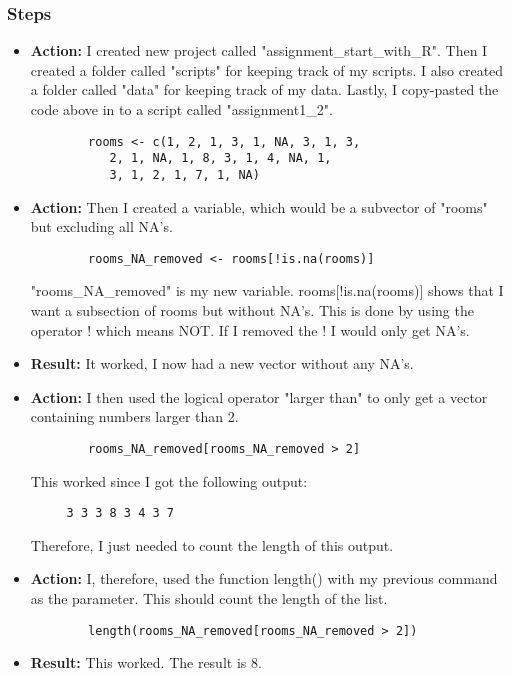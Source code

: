 \documentclass{article}
\begin{document}
\subsubsection{Steps}
\begin{itemize}
    \item \textbf{Action:} I created new project called "assignment\_start\_with\_R". Then I created a folder called "scripts" for keeping track of my scripts. I also created a folder called "data" for keeping track of my data. Lastly, I copy-pasted the code above in to a script called "assignment1\_2".
    \begin{verbatim}
        rooms <- c(1, 2, 1, 3, 1, NA, 3, 1, 3, 
           2, 1, NA, 1, 8, 3, 1, 4, NA, 1, 
           3, 1, 2, 1, 7, 1, NA)
    \end{verbatim}
    \item \textbf{Action:} Then I created a variable, which would be a subvector of "rooms" but excluding all NA's.
    \begin{verbatim}
        rooms_NA_removed <- rooms[!is.na(rooms)] 
    \end{verbatim}
    "rooms\_NA\_removed" is my new variable. rooms[!is.na(rooms)] shows that I want a subsection of rooms but without NA's. This is done by using the operator ! which means NOT. If I removed the ! I would only get NA's.
    \item \textbf{Result:} It worked, I now had a new vector without any NA's.
    \item \textbf{Action:} I then used the logical operator "larger than" to only get a vector containing numbers larger than 2.
    \begin{verbatim}
        rooms_NA_removed[rooms_NA_removed > 2]
    \end{verbatim}
    This worked since I got the following output:
    \begin{verbatim}
     3 3 3 8 3 4 3 7
    \end{verbatim}
    Therefore, I just needed to count the length of this output.
    \item\textbf{Action:} I, therefore, used the function length() with my previous command as the parameter. This should count the length of the list.
    \begin{verbatim}
        length(rooms_NA_removed[rooms_NA_removed > 2])
    \end{verbatim}
    \item\textbf{Result:} This worked. The result is 8. 
\end{itemize}
\end{document}
